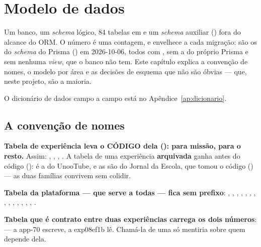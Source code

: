 \chapter{Modelo de dados}
\label{cap:dados}

Um banco, um \emph{schema} lógico, 84 tabelas em  e um \emph{schema}
auxiliar () fora do alcance do ORM. O número é uma contagem, e
envelhece a cada migração: são os  do \emph{schema} do Prisma
() em 2026-10-06, todos com , sem a
 do próprio Prisma e sem nenhuma \emph{view}, que o
banco não tem. Este capítulo explica a
convenção de nomes, o modelo por área e as decisões de esquema que não são
óbvias --- que, neste projeto, são a maioria.

O dicionário de dados campo a campo está no Apêndice~\ref{ap:dicionario}.

\section{A convenção de nomes}

\begin{regra}
\textbf{Tabela de experiência leva o CÓDIGO dela ():
 para missão,  para o resto.} Assim:
, ,
, . A tabela de
uma experiência \textbf{arquivada} ganha  antes do código
():  é a do UnooTube, e as
 são do Jornal da Escola, que tomou o código
() --- as duas famílias convivem sem colidir.

\textbf{Tabela da plataforma --- que serve a todas --- fica sem prefixo}:
, , , ,
, , , ,
, ,
, , ,
, .

\textbf{Tabela que é contrato entre duas experiências carrega os dois números}:
 --- a app-70 escreve, a exp08ef1b lê.
Chamá-la de uma só mentiria sobre quem depende dela.
\end{regra}

